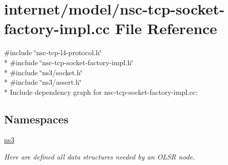 \hypertarget{nsc-tcp-socket-factory-impl_8cc}{}\section{internet/model/nsc-\/tcp-\/socket-\/factory-\/impl.cc File Reference}
\label{nsc-tcp-socket-factory-impl_8cc}
{\ttfamily \#include \char`\"{}nsc-\/tcp-\/l4-\/protocol.\+h\char`\"{}}\\*
{\ttfamily \#include \char`\"{}nsc-\/tcp-\/socket-\/factory-\/impl.\+h\char`\"{}}\\*
{\ttfamily \#include \char`\"{}ns3/socket.\+h\char`\"{}}\\*
{\ttfamily \#include \char`\"{}ns3/assert.\+h\char`\"{}}\\*
Include dependency graph for nsc-\/tcp-\/socket-\/factory-\/impl.cc\+:
\subsection*{Namespaces}
\begin{DoxyCompactItemize}
\item 
 \hyperlink{namespacens3}{ns3}
\begin{DoxyCompactList}\small\item\em Here are defined all data structures needed by an O\+L\+SR node. \end{DoxyCompactList}\end{DoxyCompactItemize}
